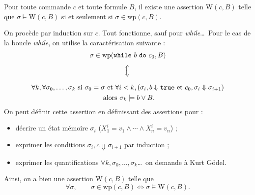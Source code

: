 \documentclass[../main]{subfiles}
\begin{document}
  \begin{prop}
    Pour toute commande $c$ et toute formule $B$, il existe une assertion $\mathrm{W}(c, B)$ telle que $\sigma \models \mathrm{W}(c, B)$ si et seulement si $\sigma \in \mathrm{wp}(c, B)$.
  \end{prop}
  \begin{prv}[esquisse]
    On procède par induction sur $c$.
    Tout fonctionne, sauf pour  \textit{while}\ldots\
    Pour le cas de la boucle \textit{while}, on utilise la caractérisation suivante :
    \begin{gather*}
      \sigma \in \mathrm{wp}(\while b {c_0}, B)\\
      \text{\rotatebox{90}{$\iff$}}\\
      \forall k, \forall \sigma_0, \ldots,\sigma_k \text{ si } \sigma_0 = \sigma \text{ et } \forall i < k, (\sigma_i, b \Downarrow \mathtt{true} \text{ et } c_0, \sigma_i \Downarrow \sigma_{i+1})\\
      \text{ alors }\sigma_k \models b \lor B
    .\end{gather*}
    On peut définir cette assertion en définissant des assertions pour :
    \begin{itemize}
      \item décrire un état mémoire $\sigma_i$ ($X^i_1 = v_1 \land \cdots \land X_n^i = v_n$) ;
      \item exprimer les conditions $\sigma_i, c \Downarrow \sigma_{i+1}$ par induction ;
      \item exprimer les quantifications $\forall k, \sigma_0, \ldots, \sigma_k$\ldots\ on demande à Kurt Gödel.
    \end{itemize}

    Ainsi, on a bien une assertion $\mathrm{W}(c, B)$ telle que \[
    \forall \sigma, \quad\quad \sigma \in \mathrm{wp}(c, B) \iff \sigma \models \mathrm{W}(c,B)
    .\] 
  \end{prv}
\end{document}
